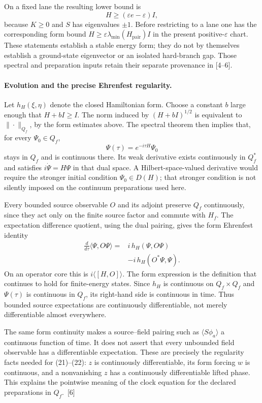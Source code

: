\documentclass[10pt,twocolumn,letterpaper]{article}
\begin{document}
On a fixed lane the resulting lower bound is
\[
H\ge (\varepsilon e-\varepsilon)I,
\]
because $K\ge0$ and $S$ has eigenvalues $\pm1$.
Before restricting to a lane one has the corresponding form bound
$H\ge\varepsilon\lambda_{\min}(H_{\mathrm{pair}})I$ in the present
positive-$\varepsilon$ chart.  These statements establish a stable
energy form; they do not by themselves establish a ground-state
eigenvector or an isolated hard-branch gap.  Those spectral and
preparation inputs retain their separate provenance in [4--6].

\paragraph{Evolution and the precise Ehrenfest regularity.}
Let $h_H(\xi,\eta)$ denote the closed Hamiltonian form.  Choose a constant
$b$ large enough that $H+bI\ge I$.  The norm induced by
$(H+bI)^{1/2}$ is equivalent to $\|\cdot\|_{Q_f}$, by the form estimates
above.  The spectral theorem then implies that, for every
$\Psi_0\in Q_f$,
\[
\Psi(\tau)=e^{-i\tau H}\Psi_0
\]
stays in $Q_f$ and is continuous there.  Its weak derivative exists
continuously in $Q_f^*$ and satisfies
$i\dot\Psi=H\Psi$ in that dual space.  A Hilbert-space-valued derivative
would require the stronger initial condition $\Psi_0\in D(H)$; that
stronger condition is not silently imposed on the continuum
preparations used here.

Every bounded source observable $O$ and its adjoint preserve $Q_f$
continuously, since they act only on the finite source factor and
commute with $H_f$.  The expectation difference quotient, using the
dual pairing, gives the form Ehrenfest identity
\[
\begin{aligned}
\frac{d}{d\tau}\langle\Psi,O\Psi\rangle
={}&i\,h_H(\Psi,O\Psi)\\
&-i\,h_H(O^*\Psi,\Psi).
\end{aligned}
\]
On an operator core this is
$i\langle[H,O]\rangle$.  The form expression is the definition that
continues to hold for finite-energy states.  Since $h_H$ is continuous on
$Q_f\times Q_f$ and $\Psi(\tau)$ is continuous in $Q_f$, its right-hand
side is continuous in time.  Thus bounded source expectations are
continuously differentiable, not merely differentiable almost
everywhere.

The same form continuity makes a source--field pairing such as
$\langle S\phi_a\rangle$ a continuous function of time.  It does not
assert that every unbounded field observable has a differentiable
expectation.  These are precisely the regularity facts needed for
(21)--(22): $z$ is continuously differentiable, its form forcing $w$ is
continuous, and a nonvanishing $z$ has a continuously differentiable
lifted phase.  This explains the pointwise meaning of the clock equation
for the declared preparations in $Q_f$.~[6]
\end{document}

